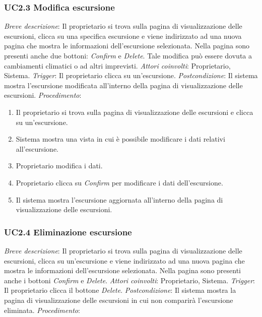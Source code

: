 \subsubsection{UC2.3 Modifica escursione}

 \emph{Breve descrizione}: Il proprietario si trova sulla pagina di visualizzazione delle escursioni, clicca su una specifica escursione e viene indirizzato ad una nuova pagina che mostra le informazioni dell'escursione selezionata. Nella pagina sono presenti anche due bottoni: \textit{Confirm} e \textit{Delete}.
Tale modifica può essere dovuta a cambiamenti climatici o ad altri imprevisti.\medbreak
 \emph{Attori coinvolti}: Proprietario, Sistema.\medbreak
 \emph{Trigger}: Il proprietario clicca su un'escursione.\medbreak
 \emph{Postcondizione}: Il sistema mostra l'escursione modificata all'interno della pagina di visualizzazione delle escursioni.\medbreak
 \emph{Procedimento}:

\begin{enumerate}
    \item Il proprietario si trova sulla pagina di visualizzazione delle escursioni e clicca su un'escursione.
    \item Sistema mostra una vista in cui è possibile modificare i dati relativi all'escursione.
    \item Proprietario modifica i dati.
    \item Proprietario clicca su \textit{Confirm} per modificare i dati dell'escursione.
    \item Il sistema mostra l'escursione aggiornata all'interno della pagina di visualizzazione delle escursioni.
\end{enumerate}

\subsubsection{UC2.4 Eliminazione escursione}

 \emph{Breve descrizione}: Il proprietario si trova sulla pagina di visualizzazione delle escursioni, clicca su un'escursione e viene indirizzato ad una nuova pagina che mostra le informazioni dell'escursione selezionata. Nella pagina sono presenti anche i bottoni \textit{Confirm} e \textit{Delete}.\medbreak
 \emph{Attori coinvolti}: Proprietario, Sistema.\medbreak
 \emph{Trigger}: Il proprietario clicca il bottone \textit{Delete}.\medbreak
 \emph{Postcondizione}: Il sistema mostra la pagina di visualizzazione delle escursioni in cui non comparirà l'escursione eliminata.\medbreak
 \emph{Procedimento}:

